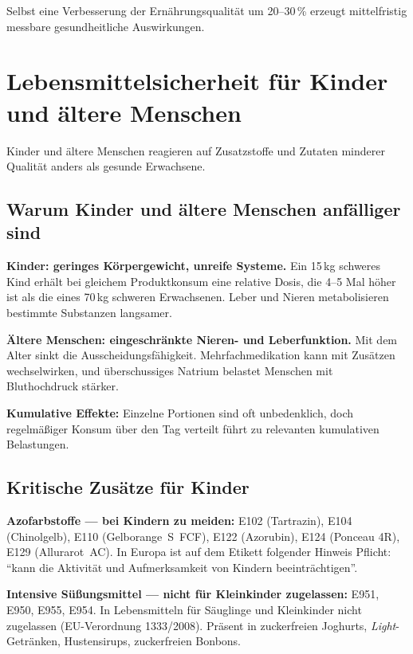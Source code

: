 \documentclass[a5paper,12pt,oneside,openany]{book}
\newcommand{\boxgruen}[2]{%
  \begin{tcolorbox}[kastenbase,
    colback=verdescuro!8!white, colframe=verdescuro, title={#1}]
  #2\end{tcolorbox}}
\begin{document}
\boxgruen{Gute Nachricht}{Selbst eine Verbesserung der Ern\"{a}hrungsqualit\"{a}t
um 20--30\,\% erzeugt mittelfristig messbare gesundheitliche Auswirkungen.}

\chapter{Lebensmittelsicherheit f\"{u}r Kinder und \"{a}ltere Menschen}

Kinder und \"{a}ltere Menschen reagieren auf Zusatzstoffe und Zutaten minderer
Qualit\"{a}t anders als gesunde Erwachsene.

\section{Warum Kinder und \"{a}ltere Menschen anf\"{a}lliger sind}

\textbf{Kinder: geringes K\"{o}rpergewicht, unreife Systeme.}
Ein 15\,kg schweres Kind erh\"{a}lt bei gleichem Produktkonsum eine relative
Dosis, die 4--5 Mal h\"{o}her ist als die eines 70\,kg schweren Erwachsenen.
Leber und Nieren metabolisieren bestimmte Substanzen langsamer.

\textbf{\"{A}ltere Menschen: eingeschr\"{a}nkte Nieren- und Leberfunktion.}
Mit dem Alter sinkt die Ausscheidungsf\"{a}higkeit. Mehrfachmedikation kann
mit Zus\"{a}tzen wechselwirken, und \"{u}berschussiges Natrium belastet
Menschen mit Bluthochdruck st\"{a}rker.

\textbf{Kumulative Effekte:}
Einzelne Portionen sind oft unbedenklich, doch regelm\"{a}{\ss}iger Konsum
\"{u}ber den Tag verteilt f\"{u}hrt zu relevanten kumulativen Belastungen.

\section{Kritische Zus\"{a}tze f\"{u}r Kinder}

\textbf{Azofarbstoffe --- bei Kindern zu meiden:}
E102 (Tartrazin), E104 (Chinolgelb), E110 (Gelborange~S~FCF), E122 (Azorubin),
E124 (Ponceau 4R), E129 (Allurarot~AC).
In Europa ist auf dem Etikett folgender Hinweis Pflicht: ``kann die Aktivit\"{a}t
und Aufmerksamkeit von Kindern beeintr\"{a}chtigen''.

\textbf{Intensive S\"{u}{\ss}ungsmittel --- nicht f\"{u}r Kleinkinder
zugelassen:}
E951, E950, E955, E954. In Lebensmitteln f\"{u}r S\"{a}uglinge und Kleinkinder
nicht zugelassen (EU-Verordnung 1333/2008). Pr\"{a}sent in zuckerfreien
Joghurts, \textit{Light}-Getr\"{a}nken, Hustensirups, zuckerfreien Bonbons.
\end{document}
